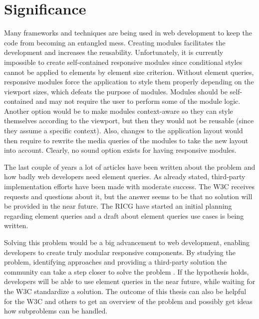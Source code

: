\documentclass[a4paper,11pt]{kth-mag}
\begin{document}
    \section{Significance}
      Many frameworks and techniques are being used in \gls{web} development to keep the code from becoming an entangled mess.
      Creating modules facilitates the development and increases the reusability.
      Unfortunately, it is currently impossible to create \gls{self-contained} \gls{responsive} modules since conditional styles cannot be applied to \glspl{element} by \gls{element} size criterion. 
      Without element queries, \gls{responsive} modules force the application to style them properly depending on the \gls{viewport} sizes, which defeats the purpose of modules.
      Modules should be \gls{self-contained} and may not require the user to perform some of the module logic.
      Another option would be to make modules context-aware so they can style themselves according to the \gls{viewport}, but then they would not be reusable (since they assume a specific context).
      Also, changes to the application layout would then require to rewrite the \gls{media queries} of the modules to take the new layout into account.
      Clearly, no sound option exists for having \gls{responsive} modules.

      The last couple of years a lot of articles have been written about the problem and how badly \gls{web} developers need element queries.
      As already stated, \gls{third-party} implementation efforts have been made with moderate success.
      The \gls{W3C} receives requests and questions about it, but the answer seems to be that no solution will be provided in the near future.
      The \gls{RICG} have started an initial planning regarding element queries and a draft \cite{ricg_draft} about element queries use cases is being written.

      Solving this problem would be a big advancement to \gls{web} development, enabling developers to create truly modular \gls{responsive} components.
      By studying the problem, identifying approaches and providing a \gls{third-party} solution the community can take a step closer to solve the problem .
      If the hypothesis holds, developers will be able to use element queries in the near future, while waiting for the \gls{W3C} standardize a solution. 
      The outcome of this thesis can also be helpful for the \gls{W3C} and others to get an overview of the problem and possibly get ideas how subproblems can be handled.
\end{document}
